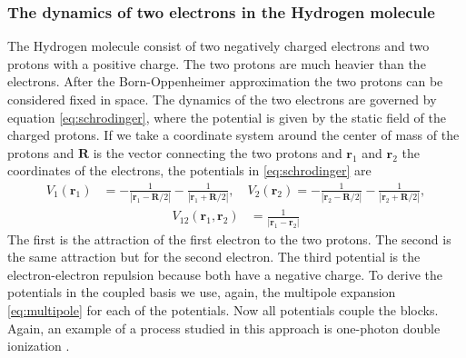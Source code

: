 \documentclass[mathpazo]{cicp}
\theoremstyle{definition}
\numberwithin{equation}{section}
\providecommand{\wv}{}
\begin{document}
\subsubsection{The dynamics of two electrons in the Hydrogen molecule}
The Hydrogen molecule consist of two negatively charged electrons and
two protons with a positive charge. The two protons are much heavier
than the electrons.  After the Born-Oppenheimer approximation \wv{the two protons can be considered fixed in space}. The
dynamics of the two electrons are governed by equation
\eqref{eq:schrodinger}, where the potential is given by the static
field of the charged protons.  If we take a coordinate system around
the center of mass of the protons and $\mathbold{R}$ is the vector
connecting the two protons \wv{and $\mathbf{r}_1$ and $\mathbf{r}_2$ the coordinates of the electrons}, the potentials in \eqref{eq:schrodinger}
are
\begin{equation}
 \begin{aligned}
  V_1(\mathbold{r}_1) &= -\frac{1}{|\mathbold{r}_1-\mathbold{R}/2|} -\frac{1}{|\mathbold{r}_1+\mathbold{R}/2|}, \quad
  V_2(\mathbold{r}_2) = -\frac{1}{|\mathbold{r}_2-\mathbold{R}/2|} -\frac{1}{|\mathbold{r}_2+\mathbold{R}/2|},
\end{aligned}
\end{equation}
\begin{equation}
 \begin{aligned}
 V_{12}(\mathbold{r}_1,\mathbold{r}_2) &= \frac{1}{|\mathbold{r}_1-\mathbold{r}_2|}
 \end{aligned}
\end{equation}
The first is the attraction of the first electron to the two
protons. The second is the same attraction but for the second
electron.  The third potential is the electron-electron repulsion
because both have a negative charge.  To derive the potentials in the
coupled basis we use, again, the multipole expansion
\eqref{eq:multipole} for each of the potentials.  \wv{Now all potentials 
couple the blocks.}  Again, an example of a process studied in this
approach is one-photon double ionization \cite{Wim05}.
\end{document}
